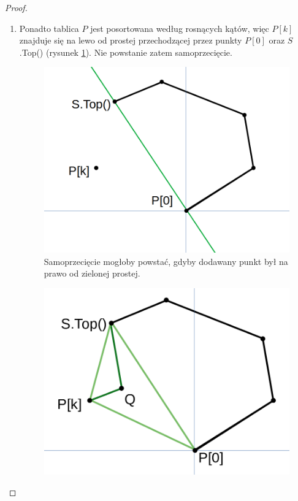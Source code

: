 \begin{theorem}
\begin{proof}
\begin{enumerate}
\begin{itemize}
\begin{enumerate}
					\item Ponadto tablica $P$ jest posortowana według rosnących kątów, więc $P[k]$ znajduje się na lewo od prostej przechodzącej przez punkty $P[0]$ oraz $S$.Top() (rysunek \ref{fig:graham:samoprzeciecie}). Nie powstanie zatem samoprzecięcie.
					
					\begin{minipage}{0.47\linewidth}
						\begin{figure}[H]
							\centering
							\includegraphics[width=\textwidth]{data/graham1.png}
							\caption{\small Samoprzecięcie mogłoby powstać, gdyby dodawany punkt był na prawo od zielonej prostej.}
							\label{fig:graham:samoprzeciecie}
						\end{figure}
					\end{minipage}
					\hfill
					\begin{minipage}{0.47\linewidth}
						\begin{figure}[H]
							\centering
							\includegraphics[width=\textwidth]{data/graham2.png}

\end{figure}
\end{minipage}
\end{enumerate}
\end{itemize}
\end{enumerate}
\end{proof}
\end{theorem}
